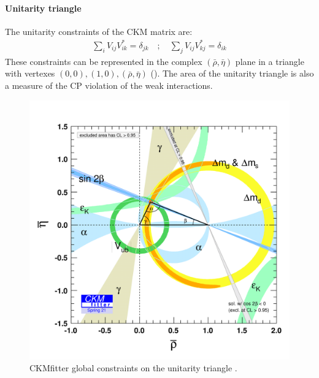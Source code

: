 \paragraph*{Unitarity triangle}
The unitarity constraints of the CKM matrix are:
\begin{gather}
    \sum_i V_{ij}V_{ik}^*=\delta_{jk} \quad ; \quad 
    \sum_j V_{ij}V_{kj}^*=\delta_{ik}
\end{gather}
These constraints can be represented in the complex $(\bar{\rho},\bar{\eta})$ plane in a triangle with vertexes $(0,0), (1,0), (\bar{\rho},\bar{\eta})$ (). The area of the unitarity triangle is also a measure of the CP violation of the weak interactions.
\begin{figure}[H]
    \centering
    \includegraphics[width=0.69\linewidth]{fig//chap02-theory/triangle.png}
    \caption{CKMfitter global constraints on the unitarity triangle \cite{CKMfitter}.}
    \label{fig:triangle}
\end{figure}
